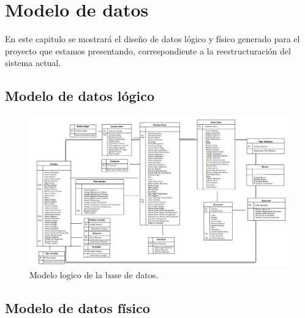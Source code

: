 \chapter{Modelo de datos}
\label{cap:modelo}
En este capitulo se mostrará el diseño de datos lógico y físico generado para el proyecto que estamos presentando, correspondiente a la reestructuración del sistema actual. 

\section{Modelo de datos lógico}
\begin{figure}[htb]
  \begin{center}
    \includegraphics[width=\linewidth]{Modelo_logico.jpg}
        \caption{Modelo logico de la base de datos.}
    \label{fig:modelo-logico}
  \end{center}
\end{figure}


\section{Modelo de datos físico}

\cleardoublepage

